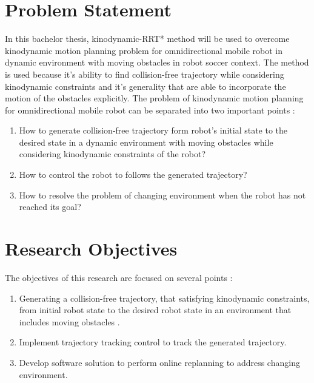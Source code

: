 \documentclass[../thesis.tex]{subfiles}
\begin{document}
\section{Problem Statement}

In this bachelor thesis, kinodynamic-RRT* method will be used to overcome kinodynamic motion planning problem for omnidirectional mobile robot in dynamic environment with moving obstacles in robot soccer context. The method is used because it's ability to find collision-free trajectory while considering kinodynamic constraints and it's generality that are able to incorporate the motion of the obstacles explicitly. The problem of kinodynamic motion planning for omnidirectional mobile robot can be separated into two important points :

\begin{enumerate}
\item How to generate collision-free trajectory form robot's initial state to the desired state in a dynamic environment with moving obstacles while considering kinodynamic constraints of the robot?
\item How to control the robot to follows the generated trajectory?
\item How to resolve the problem of changing environment when the robot has not reached its goal?
\end{enumerate}

\section{Research Objectives}

The objectives of this research are focused on several points :
\begin{enumerate}
\item Generating a collision-free trajectory, that satisfying kinodynamic constraints, from initial robot state to the desired robot state in an environment that includes moving obstacles .
\item Implement trajectory tracking control to track the generated trajectory.
\item Develop software solution to perform online replanning to address changing environment.
\end{enumerate}
\end{document}
